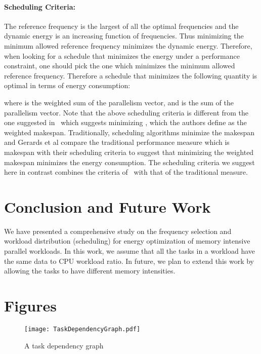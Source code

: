 \documentclass[11pt, letterpaper]{article}
\begin{document}
\paragraph{Scheduling Criteria:} The reference frequency is the largest of all the optimal frequencies and the dynamic energy is an increasing function of frequencies. Thus minimizing the minimum allowed reference frequency minimizes the dynamic energy. Therefore, when looking for a schedule that minimizes the energy under a performance constraint, one should pick the one which minimizes the minimum allowed reference frequency.
 Therefore a schedule that minimizes the following quantity is optimal in terms of energy consumption:
 
  where  is the weighted sum of the parallelism vector,   and  is the sum of the parallelism vector.
  Note that the above scheduling criteria is different from the one suggested in~\cite{ConvexAndScheduling} which suggests minimizing   , which the authors define as the weighted makespan. Traditionally, scheduling algorithms minimize the makespan~\cite{MinMakespan1, MinMakespan2, Pinedo} and Gerards et al compare the traditional performance measure which is makespan with their scheduling criteria to suggest that minimizing the weighted makespan minimizes the energy consumption. The scheduling criteria we suggest here in contrast combines the criteria of~\cite{ConvexAndScheduling} with that of the traditional measure.

\section{Conclusion and Future Work}\label{Conclusion}
We have presented a comprehensive study on the frequency selection and workload distribution (scheduling) for energy optimization of memory intensive parallel workloads. In this work, we assume that all the tasks in a workload have the same data to CPU workload ratio. In future, we plan to extend this work by allowing the tasks to have different memory intensities.




\pagebreak

 

\pagebreak

\appendix
\renewcommand{\thesection}{\Alph{section}}\section{Figures}
\begin{figure}[h!]
  \begin{center}
   \texttt{[image: TaskDependencyGraph.pdf]}
  \end{center}
  \vspace*{-15mm}
  \caption{A task dependency graph}
   \label{figure:TaskDependenyGraph}
 \end{figure}
 
\end{document}
